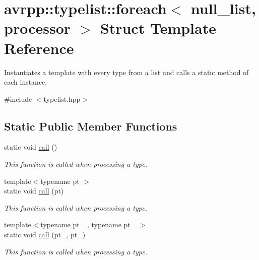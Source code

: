 \hypertarget{structavrpp_1_1typelist_1_1foreach_3_01null__list_00_01processor_01_4}{
\section{avrpp::typelist::foreach$<$ null\_\-list, processor $>$ Struct Template Reference}
\label{structavrpp_1_1typelist_1_1foreach_3_01null__list_00_01processor_01_4}
}


Instantiates a template with every type from a list and calls a static method of each instance.  




{\ttfamily \#include $<$typelist.hpp$>$}

\subsection*{Static Public Member Functions}
\begin{DoxyCompactItemize}
\item 
static void \hyperlink{structavrpp_1_1typelist_1_1foreach_3_01null__list_00_01processor_01_4_a92b089408b724bd6334985a73e988da7}{call} ()
\begin{DoxyCompactList}\small\item\em This function is called when processing a type. \item\end{DoxyCompactList}\item 
{\footnotesize template$<$typename pt $>$ }\\static void \hyperlink{structavrpp_1_1typelist_1_1foreach_3_01null__list_00_01processor_01_4_a9c7e8de3013d700dc0e9834a78438c1f}{call} (pt)
\begin{DoxyCompactList}\small\item\em This function is called when processing a type. \item\end{DoxyCompactList}\item 
{\footnotesize template$<$typename pt\_ , typename pt\_ $>$ }\\static void \hyperlink{structavrpp_1_1typelist_1_1foreach_3_01null__list_00_01processor_01_4_a7a7fc3b822de5b524e3c1008c1261079}{call} (pt\_, pt\_)
\begin{DoxyCompactList}\small\item\em This function is called when processing a type. \item\end{DoxyCompactList}\end{DoxyCompactItemize}


